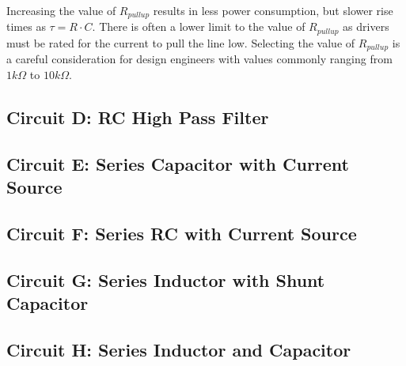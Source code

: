 \documentclass[main.tex]{subfiles}
\begin{document}

Increasing the value of $R_{pullup}$ results in less power consumption, but slower rise times as $\tau = R \cdot C$. There is often a lower limit to the value of $R_{pullup}$ as drivers must be rated for the current to pull the line low. Selecting the value of $R_{pullup}$ is a careful consideration for design engineers with values commonly ranging from $1 k \Omega$ to $10 k \Omega$.

\subsection{Circuit D: RC High Pass Filter}

\subsection{Circuit E: Series Capacitor with Current Source}

\subsection{Circuit F: Series RC with Current Source}

\subsection{Circuit G: Series Inductor with Shunt Capacitor}

\subsection{Circuit H: Series Inductor and Capacitor}
\end{document}
